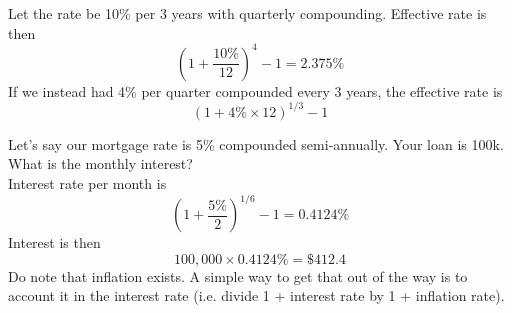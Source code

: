 \documentclass[12pt]{article}
\begin{document}
\begin{ex}
    Let the rate be 10\% per 3 years with quarterly compounding. Effective rate is then
    $$\left(1 + \frac{10\%}{12}\right)^4 - 1 = 2.375\%$$
    If we instead had 4\% per quarter compounded every 3 years, the effective rate is
    $$(1 + 4\% \times 12)^{1/3} - 1$$
\end{ex}

\begin{ex}
    Let's say our mortgage rate is 5\% compounded semi-annually. Your loan is 100k. What is the monthly interest? \\
    Interest rate per month is
    $$\left(1 + \frac{5\%}{2}\right)^{1/6} - 1 = 0.4124\%$$
    Interest is then
    $$100,000 \times 0.4124\% = \$412.4$$
    Do note that inflation exists. A simple way to get that out of the way is to account it in the interest rate (i.e. divide 1 + interest rate by 1 + inflation rate).
\end{ex}
    
\end{document}
